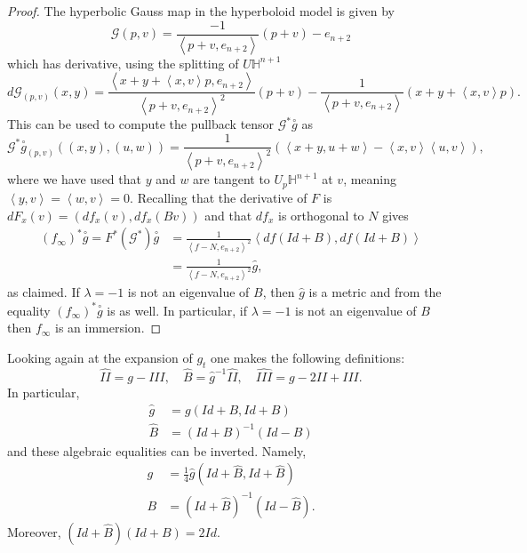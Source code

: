 \documentclass{amsart}
\newcommand{\two}{I\!\!I}
\newcommand{\three}{I\!\!I\!\!I}
\numberwithin{equation}{section}
\renewcommand{\H}{\mathbb{H}}
\begin{document}
\begin{proof}
The hyperbolic Gauss map in the hyperboloid model is given by 
\[
\mathcal{G}(p,v) = \frac{-1}{\left< p + v, e_{n+2} \right>} (p + v) - e_{n+2}
\]
which has derivative, using the splitting of $U\H^{n+1}$
\[
d\mathcal{G}_{(p,v)}(x,y) = 
\frac{\left< x + y + \left<x,v\right>p, e_{n+2} \right>}{\left< p + v, e_{n+2} \right>^2}(p+v) - \frac{1}{\left< p + v, e_{n+2} \right>}(x + y + \left<x,v\right>p).
\]
This can be used to compute the pullback tensor $\mathcal{G}^*\overset{\circ}{g}$ as
\[
\mathcal{G}^*\overset{\circ}{g}_{(p,v)}((x,y),(u,w))
= \frac{1}{\left< p+v, e_{n+2}\right>^2}\left( \left<x+y,u+w\right> - \left<x,v\right>\left<u,v\right>\right),
\]
where we have used that $y$ and $w$ are tangent to $U_p\H^{n+1}$ at $v$, meaning $\left<y,v\right> = \left<w,v\right> =0$.
Recalling that the derivative of $F$ is $dF_x(v) = (df_x(v),df_x(Bv))$ and that $df_x$ is orthogonal to $N$ gives 
\begin{align*}
(f_\infty)^*\overset{\circ}{g} = F^*(\mathcal{G}^*)\overset{\circ}{g}
&=\frac{1}{\left< f - N , e_{n+2}\right>^2} \left< df(Id + B),df(Id + B)\right> \\
&= \frac{1}{\left< f - N , e_{n+2}\right>^2} \hat{g},
\end{align*}
as claimed.
If $\lambda = -1$ is not an eigenvalue of $B$, then $\hat{g}$ is a metric and from the equality $(f_\infty)^*\overset{\circ}{g}$ is as well. In particular, if $\lambda =-1$ is not an eigenvalue of $B$ then $f_\infty$ is an immersion.
\end{proof}



Looking again at the expansion of $g_t$ one makes the following definitions:
\[
\hat{\two} = g - \three, \quad \hat{B} = \hat{g}^{-1}\hat{\two}, \quad \hat{\three} = g - 2\two + \three.
\]
In particular,
\begin{equation}
\label{TensorsAtInfinity}
\begin{aligned}
\hat{g} &= g(Id+B, Id + B) \\
\hat{B} &= (Id + B)^{-1}(Id-B)
\end{aligned}
\end{equation}
and these algebraic equalities can be inverted. Namely,
\begin{equation}
\label{Tensors}
\begin{aligned} 
g &= \frac{1}{4}\hat{g}(Id + \hat{B}, Id + \hat{B}) \\
B &= (Id + \hat{B})^{-1}(Id - \hat{B}).
\end{aligned}
\end{equation}
Moreover, $(Id + \hat{B})(Id + B) = 2Id$.
\end{document}
